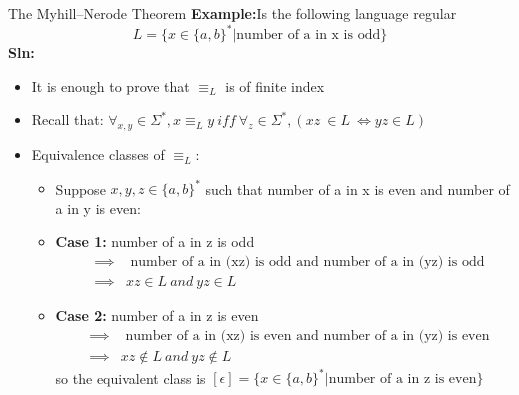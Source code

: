 \documentclass{beamer}
\begin{document}
\begin{frame}{The Myhill–Nerode Theorem}
	\textbf{Example:}Is the following language regular
	$$L=\{x \in \{a,b\}^* \big| \mbox{number of a in x is odd}\}$$
	\textbf{Sln:}\\
	\begin{itemize}
		\item It is enough to prove that $\equiv_L$ is of finite index
		\item Recall that: $\forall_{x,y} \in \Sigma^*, x\equiv_L y\  iff\  \forall_z \in \Sigma^*, (xz\  \in L \ \Leftrightarrow yz \in L)$
		\item Equivalence classes of $\equiv_L:$
		\begin{itemize}
			\item Suppose $x,y,z \in \{a,b\}^*$ such that number of a in x is even and number of a in y is even:
			\item \textbf{Case 1:} number of a in z is odd
			\begin{eqnarray*}
				 &\implies &\mbox{ number of a in  (xz) is odd and number of a in  (yz) is odd}\\
				  &\implies & xz \in L \ and \ yz \in L
			\end{eqnarray*}
				\item \textbf{Case 2:} number of a in z is even
			\begin{eqnarray*}
				&\implies &\mbox{ number of a in  (xz) is even and number of a in  (yz) is even}\\
				&\implies & xz \notin L \ and \ yz \notin L
			\end{eqnarray*}
		so the equivalent class is $[\epsilon] = \{x \in \{a,b\}^* \big| \mbox{number of a in z is even}\}$ 
	
		\end{itemize}
		
	\end{itemize}
\end{frame}	
\end{document}
